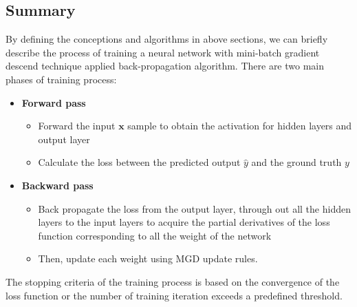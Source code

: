 \subsection{Summary}
\hspace{0.5cm} By defining the conceptions and algorithms in above sections, we can briefly describe the process of training a neural network with mini-batch gradient descend technique applied back-propagation algorithm. There are two main phases of training process:
\begin{itemize}
    \item \textbf{Forward pass}
    \begin{itemize}
        \item Forward the input $\pmb{x}$ sample to obtain the activation for hidden layers and output layer
        \item Calculate the loss between the predicted output $\hat{y}$ and the ground truth $y$
    \end{itemize}
    \item \textbf{Backward pass}
    \begin{itemize}
        \item Back propagate the loss from the output layer, through out all the hidden layers to the input layers to acquire the partial derivatives of the loss function corresponding to all the weight of the network
        \item Then, update each weight using MGD update rules.
    \end{itemize}
\end{itemize}\par
The stopping criteria of the training process is based on the convergence of the loss function or the number of training iteration exceeds a predefined threshold.

